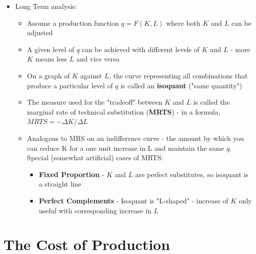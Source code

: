 \documentclass{exam}
\begin{document}
\begin{itemize}
    \begin{itemize}
      \item Marginal product rises quickly at first, then falls, eventually goes to zero (and then negative). This is the
        \textbf{diminishing marginal returns} concept that we've seen before.
      \item Average product rises, peaks when average product equals marginal product
      \item Total product rises until marginal product goes to zero
    \end{itemize}
  \item Long Term analysis:
    \begin{itemize}
      \item Assume a production function $q=F(K,L)$ where both $K$ and $L$ can be adjusted
      \item A given level of $q$ can be achieved with different levels of $K$ and $L$ - more $K$ means less $L$ and
        vice versa
      \item On a graph of $K$ against $L$, the curve representing all combinations that produce a particular level of $q$ is
        called an \textbf{isoquant} ("same quantity")
      \item The measure used for the "tradeoff" between $K$ and $L$ is called the marginal rate of technical
        substitution (\textbf{MRTS}) - in a formula, $MRTS = -\Delta K / \Delta L$
      \item Analogous to MRS on an indifference curve - the amount by which you can reduce K for a one unit increase in L and maintain the same $q$. Special (somewhat artificial) cases of MRTS:
        \begin{itemize}
          \item \textbf{Fixed Proportion} - $K$ and $L$ are perfect substitutes, so isoquant is a straight line
          \item \textbf{Perfect Complements} - Isoquant is "L-shaped" - increase of $K$ only useful with corresponding increase in $L$

        \end{itemize}
    \end{itemize}
\end{itemize}

\section{The Cost of Production}
\end{document}
